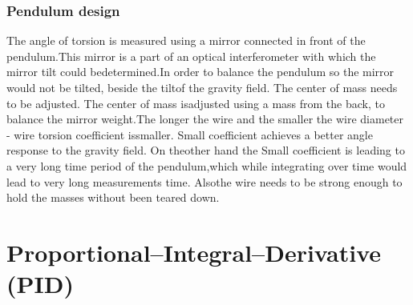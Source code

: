\documentclass[\main/master.tex]{subfiles}
\begin{document}
\subsubsection{Pendulum design}

\par\noindent
The angle of torsion is measured using a mirror connected in front of the pendulum.This mirror is a part of an optical interferometer with which the mirror tilt could bedetermined.In order to balance the pendulum so the mirror would not be tilted, beside the tiltof the gravity field. The center of mass needs to be adjusted. The center of mass isadjusted using a mass from the back, to balance the mirror weight.The longer the wire and the smaller the wire diameter - wire torsion coefficient issmaller. Small coefficient achieves a better angle response to the gravity field. On theother hand the Small coefficient is leading to a very long time period of the pendulum,which while integrating over time would lead to very long measurements time. Alsothe wire needs to be strong enough to hold the masses without been teared down.



\section{Proportional–Integral–Derivative (PID)}
\end{document}
